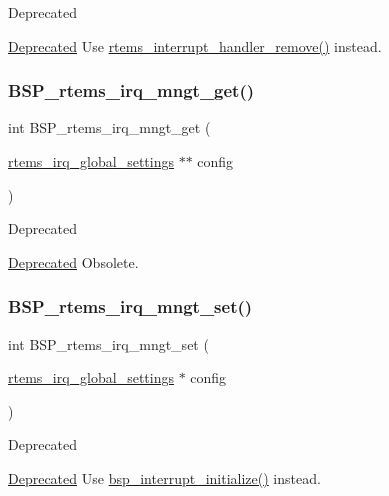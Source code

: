 \begin{DoxyRefDesc}{Deprecated}
\item[\mbox{\hyperlink{deprecated__deprecated000004}{Deprecated}}]Use \mbox{\hyperlink{group__rtems__interrupt__extension_ga90011d3f7a1f614913fd6386f1725b9d}{rtems\+\_\+interrupt\+\_\+handler\+\_\+remove()}} instead. \end{DoxyRefDesc}
\mbox{\label{irq-legacy_8c_a6d11c2b507d8ecb701bc14317ee0074c}} 
\subsubsection{\texorpdfstring{BSP\_rtems\_irq\_mngt\_get()}{BSP\_rtems\_irq\_mngt\_get()}}
{\footnotesize\ttfamily int B\+S\+P\+\_\+rtems\+\_\+irq\+\_\+mngt\+\_\+get (\begin{DoxyParamCaption}\item[{\mbox{\hyperlink{structrtems__irq__global__settings}{rtems\+\_\+irq\+\_\+global\+\_\+settings}} $\ast$$\ast$}]{config }\end{DoxyParamCaption})}

\begin{DoxyRefDesc}{Deprecated}
\item[\mbox{\hyperlink{deprecated__deprecated000006}{Deprecated}}]Obsolete. \end{DoxyRefDesc}
\mbox{\label{irq-legacy_8c_a816465eef6ad100fa2bd72f38933721b}} 
\subsubsection{\texorpdfstring{BSP\_rtems\_irq\_mngt\_set()}{BSP\_rtems\_irq\_mngt\_set()}}
{\footnotesize\ttfamily int B\+S\+P\+\_\+rtems\+\_\+irq\+\_\+mngt\+\_\+set (\begin{DoxyParamCaption}\item[{\mbox{\hyperlink{structrtems__irq__global__settings}{rtems\+\_\+irq\+\_\+global\+\_\+settings}} $\ast$}]{config }\end{DoxyParamCaption})}

\begin{DoxyRefDesc}{Deprecated}
\item[\mbox{\hyperlink{deprecated__deprecated000005}{Deprecated}}]Use \mbox{\hyperlink{group__bsp__interrupt_gafccb8719531b51a8cf0163febeb42b29}{bsp\+\_\+interrupt\+\_\+initialize()}} instead. \end{DoxyRefDesc}
